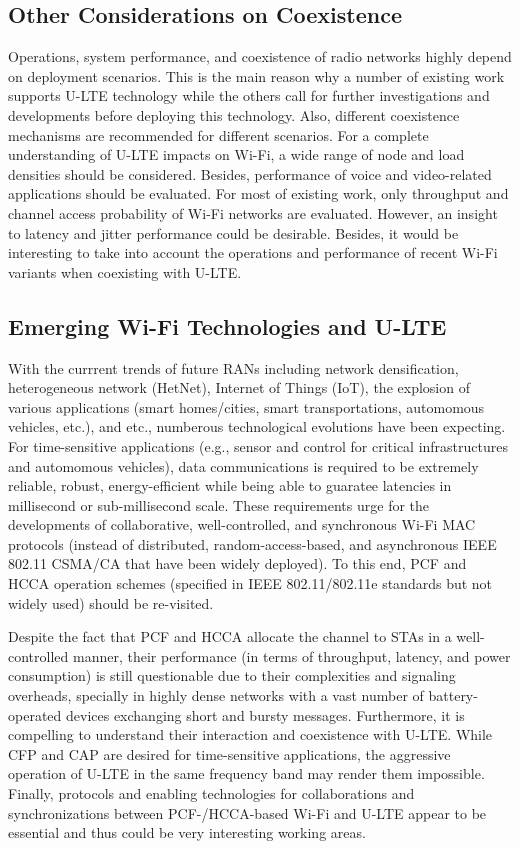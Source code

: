 \documentclass[journal,draftclsnofoot,12pt,onecolumn]{IEEEtran}
\begin{document}
\subsection{Other Considerations on Coexistence}

Operations, system performance, and coexistence of radio networks highly depend on deployment scenarios. This is the main reason why a number of existing work supports U-LTE technology while the others call for further investigations and developments before deploying this technology. Also, different coexistence mechanisms are recommended for different scenarios. For a complete understanding of U-LTE impacts on Wi-Fi, a wide range of node and load densities should be considered. Besides, performance of voice and video-related applications should be evaluated. For most of existing work, only throughput and channel access probability of Wi-Fi networks are evaluated. However, an insight to latency and jitter performance could be desirable. Besides, it would be interesting to take into account the operations and performance of recent Wi-Fi variants when coexisting with U-LTE.

\subsection{Emerging Wi-Fi Technologies and U-LTE}

With the currrent trends of future RANs including network densification, heterogeneous network (HetNet), Internet of Things (IoT), the explosion of various applications (smart homes/cities, smart transportations, automomous vehicles, etc.), and etc., numberous technological evolutions have been expecting. For time-sensitive applications (e.g., sensor and control for critical infrastructures and automomous vehicles), data communications is required to be extremely reliable, robust, energy-efficient while being able to guaratee latencies in millisecond or sub-millisecond scale. These requirements urge for the developments of collaborative, well-controlled, and synchronous Wi-Fi MAC protocols (instead of distributed, random-access-based, and asynchronous IEEE 802.11 CSMA/CA that have been widely deployed). To this end, PCF and HCCA operation schemes (specified in IEEE 802.11/802.11e standards but not widely used) should be re-visited.

Despite the fact that PCF and HCCA allocate the channel to STAs in a well-controlled manner, their performance (in terms of throughput, latency, and power consumption) is still questionable due to their complexities and signaling overheads, specially in highly dense networks with a vast number of battery-operated devices exchanging short and bursty messages. Furthermore, it is compelling to understand their interaction and coexistence with U-LTE. While CFP and CAP are desired for time-sensitive applications, the aggressive operation of U-LTE in the same frequency band may render them impossible. Finally, protocols and enabling technologies for collaborations and synchronizations between PCF-/HCCA-based Wi-Fi and U-LTE appear to be essential and thus could be very interesting working areas.
\end{document}
